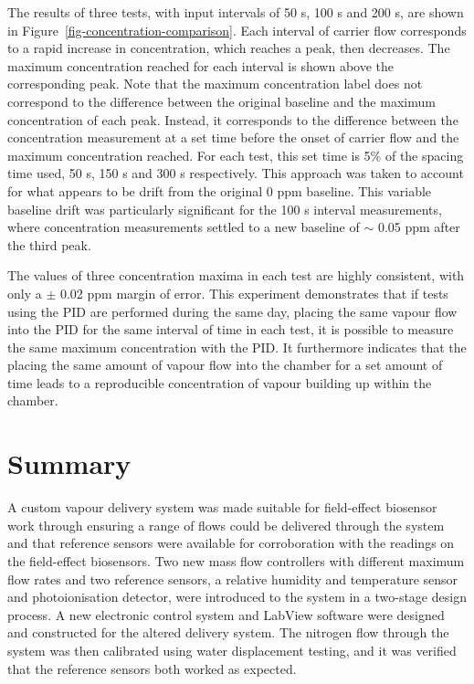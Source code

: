 \documentclass[
  a4paper,
]{scrbook}
\begin{document}
The results of three tests, with input intervals of 50 s, 100 s and 200
s, are shown in Figure~\ref{fig-concentration-comparison}. Each interval
of carrier flow corresponds to a rapid increase in concentration, which
reaches a peak, then decreases. The maximum concentration reached for
each interval is shown above the corresponding peak. Note that the
maximum concentration label does not correspond to the difference
between the original baseline and the maximum concentration of each
peak. Instead, it corresponds to the difference between the
concentration measurement at a set time before the onset of carrier flow
and the maximum concentration reached. For each test, this set time is
5\% of the spacing time used, 50 s, 150 s and 300 s respectively. This
approach was taken to account for what appears to be drift from the
original 0 ppm baseline. This variable baseline drift was particularly
significant for the 100 s interval measurements, where concentration
measurements settled to a new baseline of \(\sim\) 0.05 ppm after the
third peak.

The values of three concentration maxima in each test are highly
consistent, with only a \(\pm\) 0.02 ppm margin of error. This
experiment demonstrates that if tests using the PID are performed during
the same day, placing the same vapour flow into the PID for the same
interval of time in each test, it is possible to measure the same
maximum concentration with the PID. It furthermore indicates that the
placing the same amount of vapour flow into the chamber for a set amount
of time leads to a reproducible concentration of vapour building up
within the chamber.

\hypertarget{summary}{%
\section{Summary}\label{summary}}

A custom vapour delivery system was made suitable for field-effect
biosensor work through ensuring a range of flows could be delivered
through the system and that reference sensors were available for
corroboration with the readings on the field-effect biosensors. Two new
mass flow controllers with different maximum flow rates and two
reference sensors, a relative humidity and temperature sensor and
photoionisation detector, were introduced to the system in a two-stage
design process. A new electronic control system and LabView software
were designed and constructed for the altered delivery system. The
nitrogen flow through the system was then calibrated using water
displacement testing, and it was verified that the reference sensors
both worked as expected.
\end{document}
